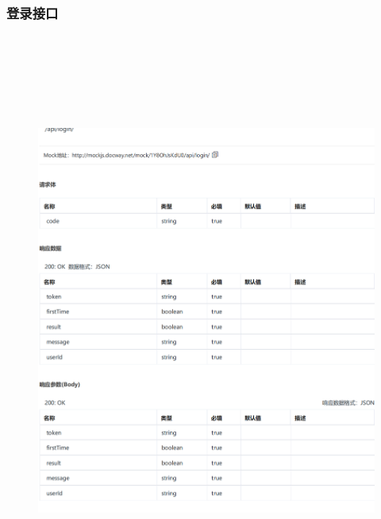     \subsubsection{登录接口}
    \begin{figure}[h]
        \centering
        \includegraphics[height=19.0cm,width=14.0cm]{design/image/api2.png} 
        \end{figure}
\newpage        
